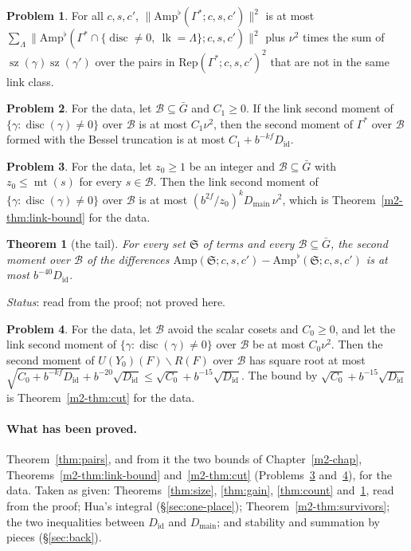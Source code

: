 \documentclass[reqno]{amsart}
\newcounter{chap}
\theoremstyle{definition}
\newtheorem{problem}{Problem}[section]
\theoremstyle{plain}
\newtheorem{theorem}{Theorem}[section]
\theoremstyle{remark}
\newcommand{\Bc}{\mathcal B}
\newcommand{\Sf}{\mathfrak S}
\newcommand{\Amp}{\mathrm{Amp}}
\newcommand{\Did}{D_{\mathrm{id}}}
\newcommand{\Dmain}{D_{\mathrm{main}}}
\newcommand{\disc}{\operatorname{disc}}
\newcommand{\lk}{\operatorname{lk}}
\newcommand{\mt}{\operatorname{mt}}
\newcommand{\sz}{\operatorname{sz}}
\newcommand{\Rep}{\mathrm{Rep}}
\begin{document}
\begin{problem}\label{pr:pieces}
For all \(c,s,c'\), \(\lVert\Amp^\flat(\Gamma^*;c,s,c')\rVert^2\) is at most \(\sum_\Lambda\lVert\Amp^\flat(\Gamma^*\cap\{\disc\ne0,\ \lk=\Lambda\};c,s,c')\rVert^2\) plus \(\nu^2\) times the sum of \(\sz(\gamma)\sz(\gamma')\) over the pairs in \(\Rep(\Gamma^*;c,s,c')^2\) that are not in the same link class.
\end{problem}

\begin{problem}\label{pr:cut-moment}
For the data, let \(\Bc\subseteq\bar G\) and \(C_1\ge0\).  If the link second moment of \(\{\gamma:\disc(\gamma)\ne0\}\) over \(\Bc\) is at most \(C_1\nu^2\), then the second moment of \(\Gamma^*\) over \(\Bc\) formed with the Bessel truncation is at most \(C_1+b^{-kf}\Did\).
\end{problem}

\begin{problem}\label{pr:link-bound}
For the data, let \(z_0\ge1\) be an integer and \(\Bc\subseteq\bar G\) with \(z_0\le\mt(s)\) for every \(s\in\Bc\).  Then the link second moment of \(\{\gamma:\disc(\gamma)\ne0\}\) over \(\Bc\) is at most \((b^{2f}/z_0)^k\Dmain\,\nu^2\), which is Theorem~\ref{m2-thm:link-bound} for the data.
\end{problem}

\begin{theorem}[the tail]\label{thm:tail}
For every set \(\Sf\) of terms and every \(\Bc\subseteq\bar G\), the second moment over \(\Bc\) of the differences \(\Amp(\Sf;c,s,c')-\Amp^\flat(\Sf;c,s,c')\) is at most \(b^{-40}\Did\).
\end{theorem}

\noindent\emph{Status}: read from the proof; not proved here.

\begin{problem}\label{pr:cut}
For the data, let \(\Bc\) avoid the scalar cosets and \(C_0\ge0\), and let the link second moment of \(\{\gamma:\disc(\gamma)\ne0\}\) over \(\Bc\) be at most \(C_0\nu^2\).  Then the second moment of \(U(Y_0)(F)\smallsetminus R(F)\) over \(\Bc\) has square root at most \(\sqrt{C_0+b^{-kf}\Did}+b^{-20}\sqrt{\Did}\le\sqrt{C_0}+b^{-15}\sqrt{\Did}\).  The bound by \(\sqrt{C_0}+b^{-15}\sqrt{\Did}\) is Theorem~\ref{m2-thm:cut} for the data.
\end{problem}

\paragraph{What has been proved.}  Theorem~\ref{thm:pairs}, and from it the two bounds of Chapter~\ref{m2-chap}, Theorems~\ref{m2-thm:link-bound} and~\ref{m2-thm:cut} (Problems~\ref{pr:link-bound} and~\ref{pr:cut}), for the data.  Taken as given: Theorems~\ref{thm:size}, \ref{thm:gain}, \ref{thm:count} and~\ref{thm:tail}, read from the proof; Hua's integral (\S\ref{sec:one-place}); Theorem~\ref{m2-thm:survivors}; the two inequalities between \(\Did\) and \(\Dmain\); and stability and summation by pieces (\S\ref{sec:back}).
\end{document}
